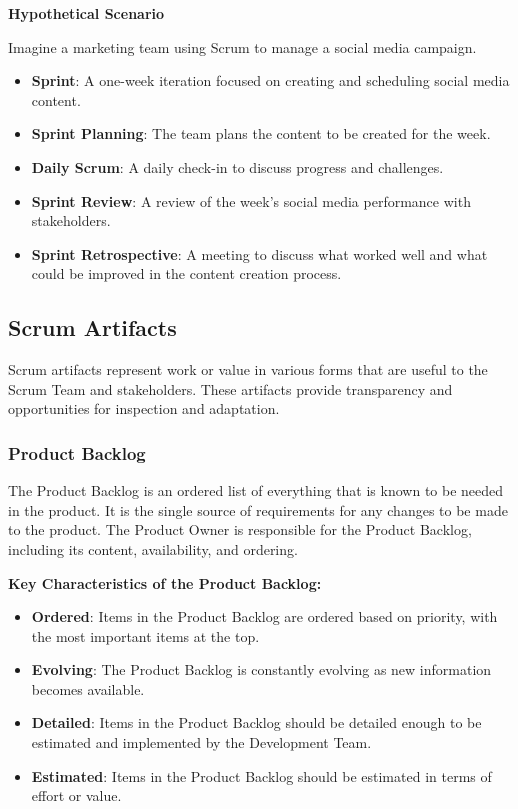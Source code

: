 \textbf{Hypothetical Scenario}

Imagine a marketing team using Scrum to manage a social media campaign.

\begin{itemize}
  \item \textbf{Sprint}: A one-week iteration focused on creating and scheduling social media content.
  \item \textbf{Sprint Planning}: The team plans the content to be created for the week.
  \item \textbf{Daily Scrum}: A daily check-in to discuss progress and challenges.
  \item \textbf{Sprint Review}: A review of the week's social media performance with stakeholders.
  \item \textbf{Sprint Retrospective}: A meeting to discuss what worked well and what could be improved in the content creation process.
\end{itemize}

\subsection{Scrum Artifacts}

Scrum artifacts represent work or value in various forms that are useful to the
Scrum Team and stakeholders. These artifacts provide transparency and
opportunities for inspection and adaptation.

\subsubsection{Product Backlog}

The Product Backlog is an ordered list of everything that is known to be needed
in the product. It is the single source of requirements for any changes to be
made to the product. The Product Owner is responsible for the Product Backlog,
including its content, availability, and ordering.

\textbf{Key Characteristics of the Product Backlog:}

\begin{itemize}
  \item \textbf{Ordered}: Items in the Product Backlog are ordered based on priority, with the most important items at the top.
  \item \textbf{Evolving}: The Product Backlog is constantly evolving as new information becomes available.
  \item \textbf{Detailed}: Items in the Product Backlog should be detailed enough to be estimated and implemented by the Development Team.
  \item \textbf{Estimated}: Items in the Product Backlog should be estimated in terms of effort or value.
\end{itemize}

